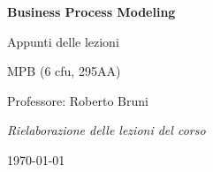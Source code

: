 \documentclass[11pt,a4paper,openany]{book}
\begin{document}
\begin{titlepage}
\centering
\vspace*{3cm}
{\Huge\bfseries\color{inkblue} Business Process Modeling\par}
\vspace{0.6cm}
{\Large\color{accentblue} Appunti delle lezioni\par}
\vspace{2.2cm}
{\large MPB (6 cfu, 295AA)\par}
\vspace{0.3cm}
{\large Professore: Roberto Bruni\par}
\vspace{3.5cm}
{\normalsize\itshape Rielaborazione delle lezioni del corso\par}
\vfill
{\normalsize \today\par}
\end{titlepage}

\frontmatter
\tableofcontents

\mainmatter

























\end{document}
